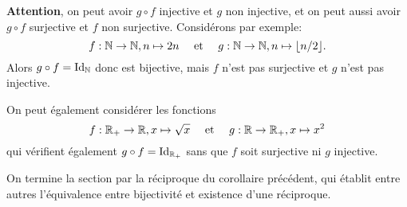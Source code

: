 \begin{remarque}
\textbf{Attention}, on peut avoir $g\circ f$ injective et $g$ non injective, et on peut aussi avoir $g\circ f$ surjective et $f$ non surjective. Considérons par exemple:
\[
f : \mathbb{N}\to \mathbb{N}, n\mapsto 2n
\quad \text{ et }\quad
g : \mathbb{N}\to \mathbb{N}, n\mapsto \lfloor n/2\rfloor.
\]
Alors $g\circ f = \operatorname{Id}_{\mathbb{N}}$ donc est bijective, mais $f$ n'est pas surjective et $g$ n'est pas injective.

On peut également considérer les fonctions
\[
f : \mathbb{R}_+\to \mathbb{R}, x\mapsto \sqrt x
\quad \text{ et }\quad
g : \mathbb{R}\to \mathbb{R}_+, x\mapsto x^2
\]
qui vérifient également $g\circ f=\operatorname{Id}_{\mathbb{R}_+}$ sans que $f$ soit surjective ni $g$ injective.
\end{remarque}



On termine la section par la réciproque du corollaire précédent, qui établit entre autres l'équivalence entre bijectivité et existence d'une réciproque.

